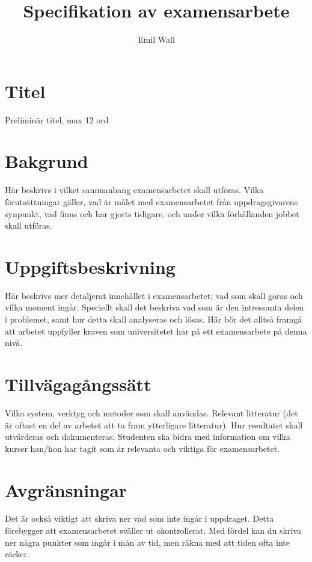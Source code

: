 \documentclass[12pt]{article}
\title{Specifikation av examensarbete}
\author{Emil Wall}
\begin{document}
\maketitle

\vspace{10mm}

\section{Titel}

Preliminär titel, max 12 ord

\section{Bakgrund}

Här beskrivs i vilket sammanhang examensarbetet skall utföras. Vilka förutsättningar gäller, vad är målet med examensarbetet från uppdragsgivarens synpunkt, vad finns och har
gjorts tidigare, och under vilka förhållanden jobbet skall utföras.

\section{Uppgiftsbeskrivning}

Här beskrivs mer detaljerat innehållet i examensarbetet: vad som skall göras och vilka moment ingår. Speciellt skall det beskriva vad som är den intressanta delen i problemet, samt
hur detta skall analyseras och lösas. Här bör det alltså framgå att arbetet uppfyller kraven som universitetet har på ett examensarbete på denna nivå.

\section{Tillvägagångssätt}

Vilka system, verktyg och metoder som skall användas. Relevant litteratur (det är oftast en del av arbetet att ta fram ytterligare litteratur). Hur resultatet skall utvärderas och
dokumenteras. Studenten ska bidra med information om vilka kurser han/hon har tagit som är relevanta och viktiga för examensarbetet.

\section{Avgränsningar}

Det är också viktigt att skriva ner vad som inte ingår i uppdraget. Detta förebygger att examensarbetet sväller ut okontrollerat. Med fördel kan du skriva ner några punkter som
ingår i mån av tid, men räkna med att tiden ofta inte räcker.
\end{document}
